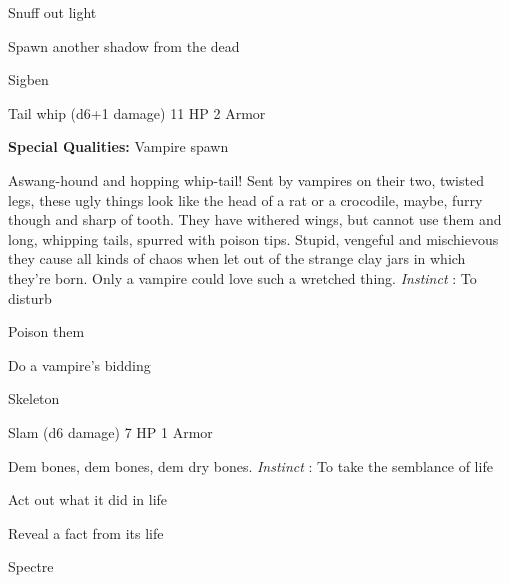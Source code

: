 \startitemize[1,packed]

\item Snuff out light

 
\item Spawn another shadow from the dead


\stopitemize
 
\startMonsterName
Sigben	 
\stopMonsterName
 

Tail whip (d6+1 damage)	11 HP	2 Armor

 


 
\startMonsterQualities
{\bf Special Qualities:}  Vampire spawn
\stopMonsterQualities
 
\startMonsterDescription
Aswang-hound and hopping whip-tail!  Sent by vampires on their two, twisted legs, these ugly things look like the head of a rat or a crocodile, maybe, furry though and sharp of tooth.  They have withered wings, but cannot use them and long, whipping tails, spurred with poison tips.  Stupid, vengeful and mischievous they cause all kinds of chaos when let out of the strange clay jars in which they’re born.  Only a vampire could love such a wretched thing. {\em Instinct} : To disturb
\stopMonsterDescription
 
\startitemize[1,packed]

\item Poison them

 
\item Do a vampire's bidding


\stopitemize
 
\startMonsterName
Skeleton	 
\stopMonsterName
 

Slam (d6 damage)	7 HP	1 Armor

 


 
\startMonsterDescription
Dem bones, dem bones, dem dry bones. {\em Instinct} : To take the semblance of life
\stopMonsterDescription
 
\startitemize[1,packed]

\item Act out what it did in life

 
\item Reveal a fact from its life


\stopitemize
 
\startMonsterName
Spectre	 
\stopMonsterName
 

